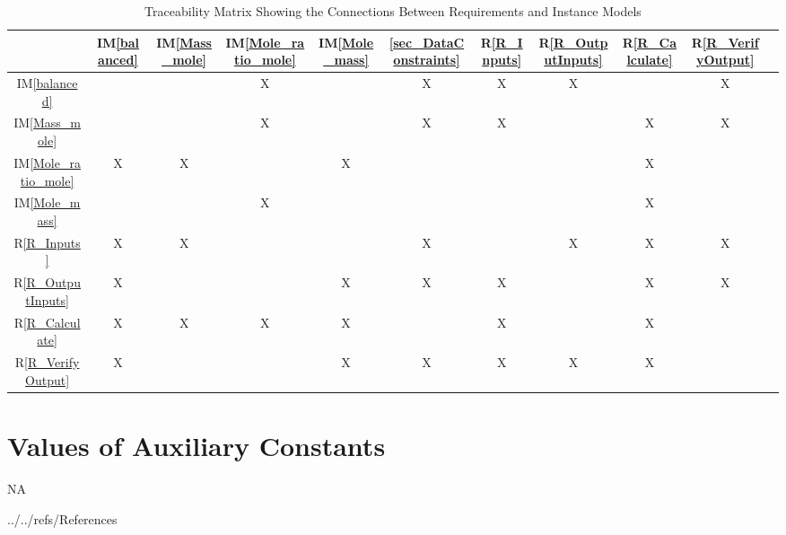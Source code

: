 \documentclass[12pt]{article}
\newcommand{\iref}[1]{IM\ref{#1}}
\newcommand{\rref}[1]{R\ref{#1}}
\begin{document}
{\begin{table}[h!]
\centering

\begin{tabular}{|c|c|c|c|c|c|c|c|c|c|c|}
\hline
	& \iref{balanced} & \iref{Mass_mole}& \iref{Mole_ratio_mole}& \iref{Mole_mass} & \ref{sec_DataConstraints}& \rref{R_Inputs}& \rref{R_OutputInputs} & \rref{R_Calculate} & \rref{R_VerifyOutput} \\
\hline
\iref{balanced}  & & & X& &X & X& X& & X \\ \hline
\iref{Mass_mole}            & & & X& & X& X& & X& X \\ \hline
\iref{Mole_ratio_mole}     & X& X& & X& & & &X &  \\ \hline
\iref{Mole_mass}             & & &X & & & & & X& \\ \hline
\rref{R_Inputs}                &X & X& & & X& & X& X&X  \\ \hline
\rref{R_OutputInputs}    &X & & & X& X& X& & X&X  \\ \hline
\rref{R_Calculate}    &X &X & X& X& & X& & X&  \\ \hline
\rref{R_VerifyOutput}  &X & & & X& X& X& X& X&\\ \hline
\hline
\end{tabular}
\caption{Traceability Matrix Showing the Connections Between Requirements and Instance Models}
\label{Table:R_trace}
\end{table}
}
\newpage

\section{Values of Auxiliary Constants}
NA 

\newpage

 {../../refs/References}

\newpage
\end{document}
